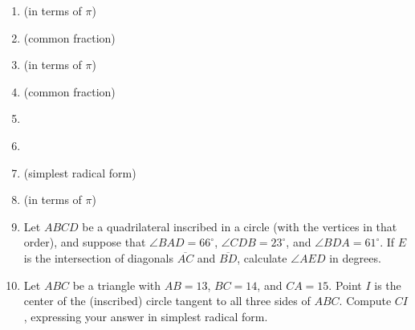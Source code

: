 \documentclass{article}
\begin{document}
\begin{enumerate}
\item \underline{\hspace{3in}} (in terms of $\pi$)\vspace{1cm}
\item \underline{\hspace{3in}} (common fraction)\vspace{1cm}
\item \underline{\hspace{3in}} (in terms of $\pi$)\vspace{1cm}
\item \underline{\hspace{3in}} (common fraction)\vspace{1cm}
\item \underline{\hspace{3in}}\vspace{1cm}
\item \underline{\hspace{3in}}\vspace{1cm}
\item \underline{\hspace{3in}} (simplest radical form)\vspace{1cm}
\item \underline{\hspace{3in}} (in terms of $\pi$)\vspace{1cm}
\item Let $ABCD$ be a quadrilateral inscribed in a circle (with the vertices in that order), and suppose that $\angle BAD = 66^{\circ}$, $\angle CDB = 23^{\circ}$, and $\angle BDA = 61^{\circ}$. If $E$ is the intersection of diagonals $\overline{AC}$ and $\overline{BD}$, calculate $\angle AED$ in degrees.
\vspace{1cm}
\item Let $ABC$ be a triangle with $AB = 13$, $BC = 14$, and $CA = 15$. Point $I$ is the center of the (inscribed) circle tangent to all three sides of $ABC$. Compute $CI$, expressing your answer in simplest radical form.
\end{enumerate}


\newpage
\end{document}
